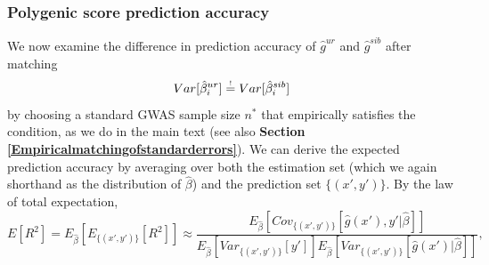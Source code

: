 \documentclass[hidelinks, 12pt]{article}
\begin{document}
\subsubsection{Polygenic score prediction accuracy}
\label{polygenic_score_prediction_accuracy}
We now examine the difference in prediction accuracy of $\hat{g}^{ur}$ and $\hat{g}^{sib}$ after matching 
\begin{equation}
\label{matching_errors_indirect}
Var[\hat{\beta}_i^{ur}] \reqeq Var[\hat{\beta}_i^{sib}]
\end{equation}
by choosing a standard GWAS sample size $n^*$ that empirically satisfies the condition, as we do in the main text (see also {\bf Section \ref{Empiricalmatchingofstandarderrors}}).  
We can derive the expected prediction accuracy by averaging over both the estimation set (which we again shorthand as the distribution of $\hat{\beta}$) and the prediction set $\{(x',y')\}$.  By the law of total expectation,
\begin{equation}
\label{total_expectation_for_R2}
E[R^2] = E_{\hat{\beta}}[E_{\{(x',y')\}}[R^2]] \approx 
\frac{E_{\hat{\beta}}[Cov_{\{(x',y')\}}[\hat{g}(x'),y'|\hat{\beta}]]}{E_{\hat{\beta}}[Var_{\{(x',y')\}}[y']]E_{\hat{\beta}}[Var_{\{(x',y')\}}[\hat{g}(x')|\hat{\beta}]]},
\end{equation}
\end{document}
